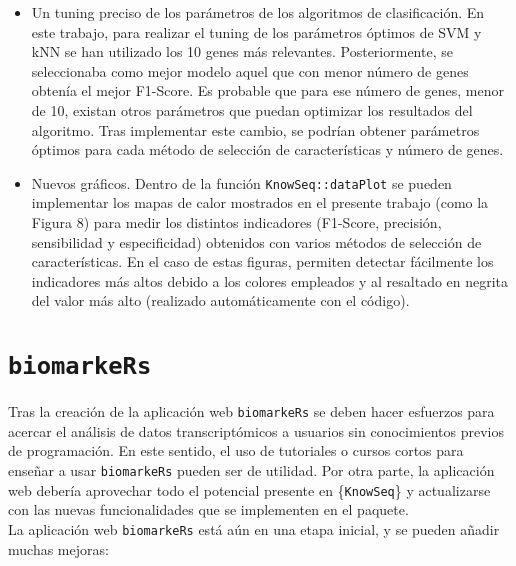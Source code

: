 \begin{itemize}
	\item Un tuning preciso de los parámetros de los algoritmos de clasificación. En este trabajo, para realizar el tuning de los parámetros óptimos de SVM y kNN se han utilizado los 10 genes más relevantes. Posteriormente, se seleccionaba como mejor modelo aquel que con menor número de genes obtenía el mejor F1-Score. Es probable que para ese número de genes, menor de 10, existan otros parámetros que puedan optimizar los resultados del algoritmo. Tras implementar este cambio, se podrían obtener parámetros óptimos para cada método de selección de características y número de genes.
	\item Nuevos gráficos. Dentro de la función \texttt{KnowSeq::dataPlot} se pueden implementar los mapas de calor mostrados en el presente trabajo (como la Figura 8) para medir los distintos indicadores (F1-Score, precisión, sensibilidad y especificidad) obtenidos con varios métodos de selección de características. En el caso de estas figuras, permiten detectar fácilmente los indicadores más altos debido a los colores empleados y al resaltado en negrita del valor más alto (realizado automáticamente con el código).
\end{itemize}

\section{\texttt{biomarkeRs}}

Tras la creación de la aplicación web \texttt{biomarkeRs} se deben hacer esfuerzos para acercar el análisis de datos transcriptómicos a usuarios sin conocimientos previos de programación. En este sentido, el uso de tutoriales o cursos cortos para enseñar a usar \texttt{biomarkeRs} pueden ser de utilidad. Por otra parte, la aplicación web debería aprovechar todo el potencial presente en \{\texttt{KnowSeq}\} y actualizarse con las nuevas funcionalidades que se implementen en el paquete.\\

La aplicación web \texttt{biomarkeRs} está aún en una etapa inicial, y se pueden añadir muchas mejoras:

